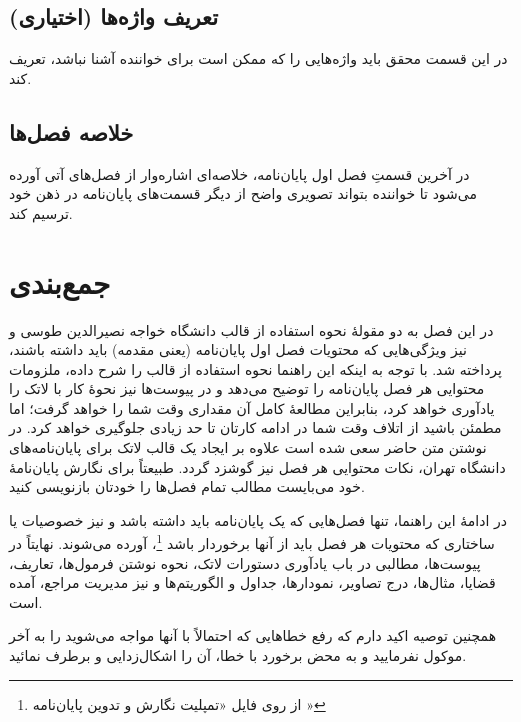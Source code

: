 \subsection{تعریف واژه‌ها (اختیاری)}
در این قسمت محقق باید واژه‌هایی را که ممکن است برای خواننده آشنا نباشد، تعریف کند.

\subsection{خلاصه فصل‌ها}
در آخرین قسمتِ فصل اول پایان‌نامه، خلاصه‌ای اشاره‌وار از فصل‌های آتی آورده می‌شود تا خواننده بتواند تصویری واضح از دیگر قسمت‌های پایان‌نامه در ذهن خود ترسیم کند.

\section{جمع‌بندی}
در این فصل به دو مقولهٔ نحوه استفاده از قالب \پ دانشگاه خواجه نصیرالدین طوسی و نیز ویژگی‌هایی که محتویات فصل اول پایان‌نامه (یعنی مقدمه) باید داشته باشند، پرداخته شد. با توجه به اینکه این راهنما نحوه استفاده از قالب را شرح داده، ملزومات محتوایی هر فصل پایان‌نامه را توضیح می‌دهد و در پیوست‌ها نیز نحوهٔ کار با لاتک را یادآوری خواهد کرد، بنابراین مطالعهٔ کامل آن مقداری وقت شما را خواهد گرفت؛ اما مطمئن باشید از اتلاف وقت شما در ادامه کارتان تا حد زیادی جلوگیری خواهد کرد. در نوشتن متن حاضر سعی شده است علاوه بر ایجاد یک قالب لاتک برای پایان‌نامه‌های دانشگاه تهران، نکات محتوایی هر فصل نیز گوشزد گردد. طبیعتاً برای نگارش پایان‌نامهٔ خود می‌بایست مطالب تمام فصل‌ها را خودتان بازنویسی کنید.

در ادامهٔ این راهنما، تنها فصل‌هایی که یک پایان‌نامه باید داشته باشد و نیز خصوصیات یا ساختاری که محتویات هر فصل باید از آنها برخوردار باشد%
\footnote{از روی فایل «تمپلیت نگارش و تدوین پایان‌نامه \cite{KNTUThesisGuide}»}،
آورده می‌شوند. نهایتاً  در پیوست‌ها، مطالبی در باب یادآوری دستورات لاتک، نحوه نوشتن فرمول‌ها، تعاریف، قضایا، مثال‌ها، درج تصاویر، نمودارها، جداول و الگوریتم‌ها و نیز مدیریت مراجع، آمده است.

همچنین توصیه اکید دارم که رفع خطاهایی که احتمالاً با آنها مواجه می‌شوید را به آخر موکول نفرمایید و به محض برخورد با خطا، آن را اشکال‌زدایی و برطرف نمائید.